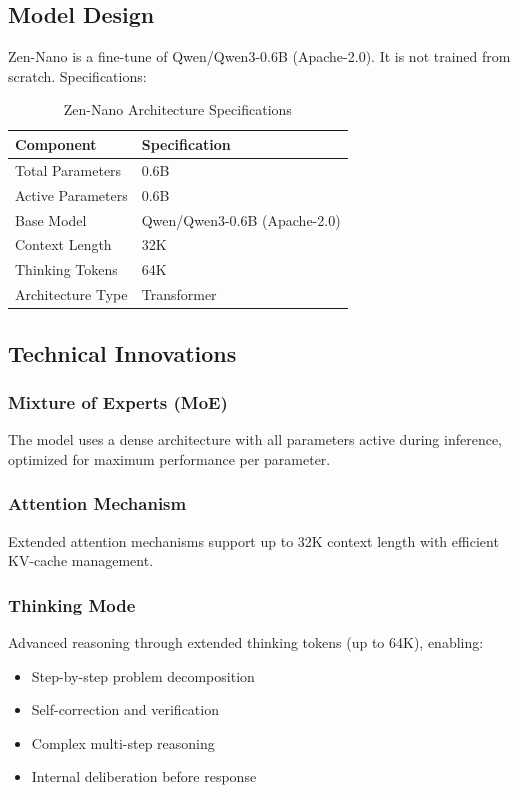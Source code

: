 \documentclass[11pt,a4paper]{article}
\begin{document}
\subsection{Model Design}

Zen-Nano is a fine-tune of Qwen/Qwen3-0.6B (Apache-2.0). It is not trained from scratch. Specifications:

\begin{table}[H]
\centering
\begin{tabular}{ll}
\toprule
\textbf{Component} & \textbf{Specification} \\
\midrule
Total Parameters & 0.6B \\
Active Parameters & 0.6B \\
Base Model & Qwen/Qwen3-0.6B (Apache-2.0) \\
Context Length & 32K \\
Thinking Tokens & 64K \\

Architecture Type & Transformer \\
\bottomrule
\end{tabular}
\caption{Zen-Nano Architecture Specifications}
\end{table}

\subsection{Technical Innovations}

\subsubsection{Mixture of Experts (MoE)}
The model uses a dense architecture with all parameters active during inference, optimized for maximum performance per parameter.

\subsubsection{Attention Mechanism}
Extended attention mechanisms support up to 32K context length with efficient KV-cache management.

\subsubsection{Thinking Mode}
Advanced reasoning through extended thinking tokens (up to 64K), enabling:
\begin{itemize}
    \item Step-by-step problem decomposition
    \item Self-correction and verification
    \item Complex multi-step reasoning
    \item Internal deliberation before response
\end{itemize}
\end{document}
